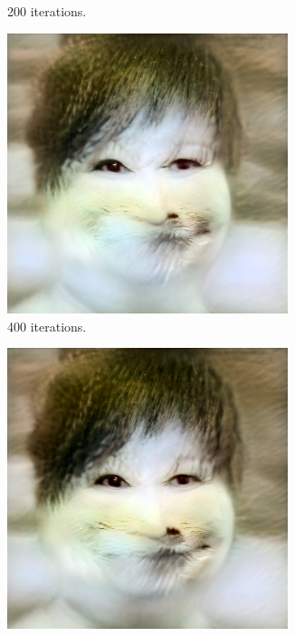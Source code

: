 \documentclass[conference]{IEEEtran}
\theoremstyle{definition}
\theoremstyle{remark}
\theoremstyle{remark}
\begin{document}
\begin{figure}
\begin{subfigure}[b]{0.15\textwidth}
    \caption{200 iterations.}
  \end{subfigure}
  \begin{subfigure}[b]{0.15\textwidth}
    \centering \includegraphics[width=0.9\textwidth]{figs/ffhq-2.png}
    \caption{400 iterations.}
  \end{subfigure}
  \begin{subfigure}[b]{0.15\textwidth}
    \centering \includegraphics[width=0.9\textwidth]{figs/ffhq-3.png}

\end{subfigure}
\end{figure}
\end{document}
